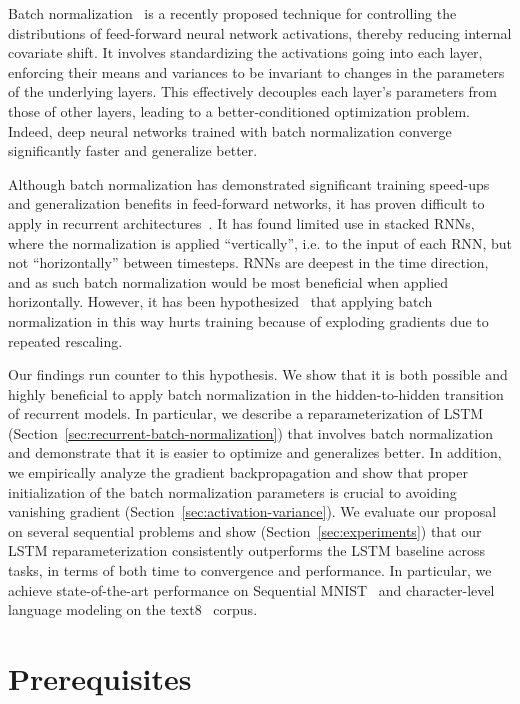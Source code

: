 \documentclass{article} %
\begin{document}
Batch normalization~\cite{batchnorm} is a recently proposed technique for controlling the distributions of feed-forward neural network activations, thereby reducing internal covariate shift.
It involves standardizing the activations going into each layer, enforcing their means and variances to be invariant to changes in the parameters of the underlying layers.
This effectively decouples each layer's parameters from those of other layers, leading to a better-conditioned optimization problem.
Indeed, deep neural networks trained with batch normalization converge significantly faster and generalize better.

Although batch normalization has demonstrated significant training speed-ups and generalization benefits in feed-forward networks,
it has proven difficult to apply in recurrent architectures~\cite{cesar,baidu}.
It has found limited use in stacked RNNs, where the normalization is applied ``vertically'',
i.e. to the input of each RNN, but not ``horizontally'' between timesteps.
RNNs are deepest in the time direction, and as such batch normalization would be most beneficial when applied horizontally.
However, it has been hypothesized~\cite{cesar} that applying batch normalization in this way hurts training
because of exploding gradients due to repeated rescaling.

Our findings run counter to this hypothesis.
We show that it is both possible and highly beneficial to apply batch normalization in the hidden-to-hidden transition of recurrent models.
In particular, we describe a reparameterization of LSTM (Section~\ref{sec:recurrent-batch-normalization}) that involves batch normalization
and demonstrate that it is easier to optimize and generalizes better.
In addition, we empirically analyze the gradient backpropagation and show that proper initialization
of the batch normalization parameters is crucial to avoiding vanishing gradient (Section~\ref{sec:activation-variance}).
We evaluate our proposal on several sequential problems and show (Section~\ref{sec:experiments}) that our
LSTM reparameterization consistently outperforms the LSTM baseline across tasks,
in terms of both time to convergence and performance.
In particular, we achieve state-of-the-art performance on
Sequential MNIST~\cite{le2015simple} and
character-level language modeling on the text8~\cite{mahoney2009large} corpus.

\section{Prerequisites}
\label{sec:prerequisites}
\end{document}
